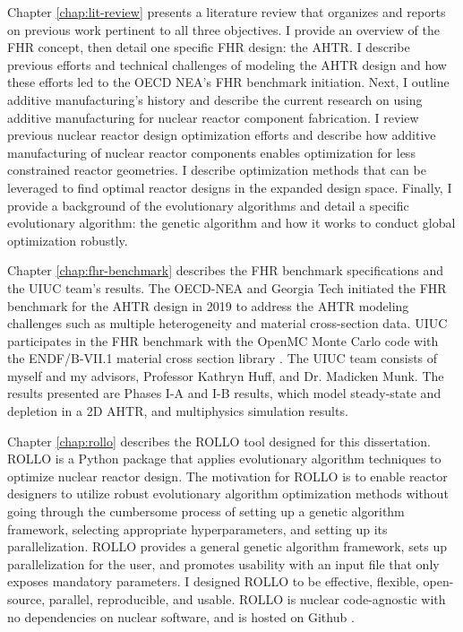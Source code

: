 Chapter \ref{chap:lit-review} presents a literature review that organizes and 
reports on previous work pertinent to all three objectives. 
I provide an overview of the \gls{FHR} concept, then detail one specific 
\gls{FHR} design: the \gls{AHTR}. 
I describe previous efforts and technical challenges of modeling the \gls{AHTR} design
and how these efforts led to the \gls{OECD} \gls{NEA}'s \gls{FHR} benchmark initiation.
Next, I outline additive manufacturing's history and describe the current 
research on using additive manufacturing for nuclear reactor component fabrication. 
I review previous nuclear reactor design optimization efforts and describe how 
additive manufacturing of nuclear reactor components enables optimization for 
less constrained reactor geometries. 
I describe optimization methods that can be leveraged to find optimal reactor 
designs in the expanded design space.
Finally, I provide a background of the evolutionary algorithms and detail a specific 
evolutionary algorithm: the genetic algorithm and how it works to conduct global 
optimization robustly.

Chapter \ref{chap:fhr-benchmark} describes the \gls{FHR} benchmark specifications and 
the \gls{UIUC} team's results.
The \gls{OECD}-\gls{NEA} and \gls{Georgia Tech} initiated the \gls{FHR} 
benchmark for the \gls{AHTR} design in 2019 \cite{petrovic_benchmark_2021} 
to address the \gls{AHTR} modeling challenges such as multiple heterogeneity and 
material cross-section data. 
\gls{UIUC} participates in the \gls{FHR} benchmark with the OpenMC Monte Carlo code 
\cite{romano_openmc_2013} with the ENDF/B-VII.1 material cross section library 
\cite{chadwick_endf/b-vii.1_2011}.
The \gls{UIUC} team consists of myself and my advisors, Professor Kathryn Huff, 
and Dr. Madicken Munk. 
The results presented are Phases I-A and I-B results, which model steady-state and 
depletion in a 2D \gls{AHTR}, and multiphysics simulation results. 

Chapter \ref{chap:rollo} describes the \acrfull{ROLLO} tool designed for this 
dissertation. 
\gls{ROLLO} is a Python package that applies evolutionary algorithm 
techniques to optimize nuclear reactor design. 
The motivation for \gls{ROLLO} is to enable reactor designers to utilize 
robust evolutionary algorithm optimization methods without going 
through the cumbersome process of setting up a genetic algorithm framework,
selecting appropriate hyperparameters, and setting up its parallelization. 
\gls{ROLLO} provides a general genetic algorithm framework, sets up 
parallelization for the user, and promotes usability with an input file 
that only exposes mandatory parameters.
I designed  \gls{ROLLO} to be effective, flexible, open-source, parallel, 
reproducible, and usable. 
\gls{ROLLO} is nuclear code-agnostic with no dependencies on  
nuclear software, and is hosted on Github \cite{chee_rollo_2021}. 

